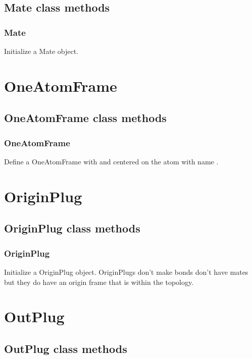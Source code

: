 \begin{itemize}
\subsection{Mate class methods}
\subsubsection{Mate}

Initialize a Mate object.

\section{OneAtomFrame}
\subsection{OneAtomFrame class methods}
\subsubsection{OneAtomFrame}

Define a OneAtomFrame with  and centered on the atom with name .


\section{OriginPlug}
\subsection{OriginPlug class methods}
\subsubsection{OriginPlug}

Initialize a OriginPlug object. OriginPlugs don't make bonds don't have mates but they do have an origin frame that is within the topology.

\section{OutPlug}
\subsection{OutPlug class methods}

\end{itemize}
